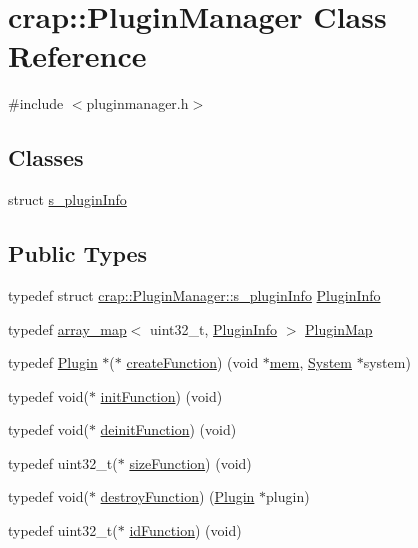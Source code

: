 \hypertarget{classcrap_1_1_plugin_manager}{}\section{crap\+:\+:Plugin\+Manager Class Reference}
\label{classcrap_1_1_plugin_manager}


{\ttfamily \#include $<$pluginmanager.\+h$>$}

\subsection*{Classes}
\begin{DoxyCompactItemize}
\item 
struct \hyperlink{structcrap_1_1_plugin_manager_1_1s__plugin_info}{s\+\_\+plugin\+Info}
\end{DoxyCompactItemize}
\subsection*{Public Types}
\begin{DoxyCompactItemize}
\item 
typedef struct \hyperlink{structcrap_1_1_plugin_manager_1_1s__plugin_info}{crap\+::\+Plugin\+Manager\+::s\+\_\+plugin\+Info} \hyperlink{classcrap_1_1_plugin_manager_afbb43a9409aeca513d85df3af9764c55}{Plugin\+Info}
\item 
typedef \hyperlink{classcrap_1_1array__map}{array\+\_\+map}$<$ uint32\+\_\+t, \hyperlink{classcrap_1_1_plugin_manager_afbb43a9409aeca513d85df3af9764c55}{Plugin\+Info} $>$ \hyperlink{classcrap_1_1_plugin_manager_ac7816f692d9a008ed7198aacd673d595}{Plugin\+Map}
\item 
typedef \hyperlink{classcrap_1_1_plugin}{Plugin} $\ast$($\ast$ \hyperlink{classcrap_1_1_plugin_manager_a89bf653ef8bdebe88020af12ad62a2ab}{create\+Function}) (void $\ast$\hyperlink{core_2unittests_2source_2queue_8cpp_a5f00e9b1b039412bb144bae39e66b97a}{mem}, \hyperlink{classcrap_1_1_system}{System} $\ast$system)
\item 
typedef void($\ast$ \hyperlink{classcrap_1_1_plugin_manager_abfa7013bbf59b2f12368d2a13f7595b8}{init\+Function}) (void)
\item 
typedef void($\ast$ \hyperlink{classcrap_1_1_plugin_manager_a9210bea4920fc2d62d5312e89e3086eb}{deinit\+Function}) (void)
\item 
typedef uint32\+\_\+t($\ast$ \hyperlink{classcrap_1_1_plugin_manager_a0c83d358e4096b6a8b9bcce66e85b633}{size\+Function}) (void)
\item 
typedef void($\ast$ \hyperlink{classcrap_1_1_plugin_manager_a7f4b2c208e89c47c06afecacbace55f3}{destroy\+Function}) (\hyperlink{classcrap_1_1_plugin}{Plugin} $\ast$plugin)
\item 
typedef uint32\+\_\+t($\ast$ \hyperlink{classcrap_1_1_plugin_manager_aae5b5d7d6f79bdfc59273630a1c5a7d9}{id\+Function}) (void)
\end{DoxyCompactItemize}
